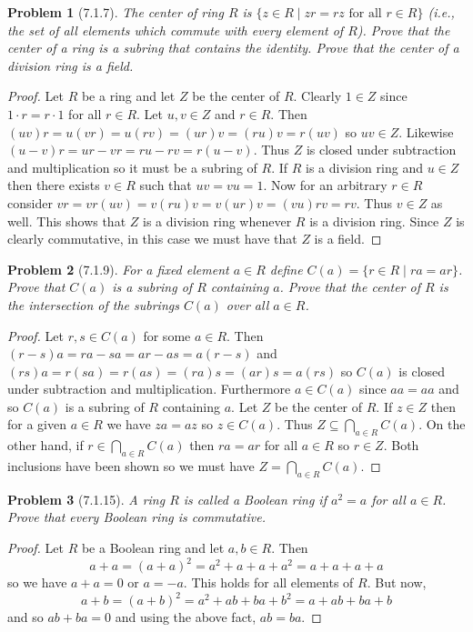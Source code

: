 \documentclass{article}
\newtheorem{problem}{Problem}
\begin{document}
\begin{problem}[7.1.7]
The center of ring $R$ is $\{z \in R \mid zr = rz \text{ for all } r \in R\}$ (i.e., the set of all elements which commute with every element of $R$). Prove that the center of a ring is a subring that contains the identity. Prove that the center of a division ring is a field.
\end{problem}
\begin{proof}
Let $R$ be a ring and let $Z$ be the center of $R$. Clearly $1 \in Z$ since $1 \cdot r = r \cdot 1$ for all $r \in R$. Let $u,v \in Z$ and $r \in R$. Then $(uv)r = u(vr) = u(rv) = (ur)v = (ru)v = r(uv)$ so $uv \in Z$. Likewise $(u-v)r = ur-vr = ru-rv=r(u-v)$. Thus $Z$ is closed under subtraction and multiplication so it must be a subring of $R$. If $R$ is a division ring and $u \in Z$ then there exists $v \in R$ such that $uv = vu = 1$. Now for an arbitrary $r \in R$ consider $vr = vr(uv) = v(ru)v = v(ur)v = (vu)rv = rv$. Thus $v \in Z$ as well. This shows that $Z$ is a division ring whenever $R$ is a division ring. Since $Z$ is clearly commutative, in this case we must have that $Z$ is a field.
\end{proof}

\begin{problem}[7.1.9]
For a fixed element $a \in R$ define $C(a) = \{r \in R \mid ra = ar\}$. Prove that $C(a)$ is a subring of $R$ containing $a$. Prove that the center of $R$ is the intersection of the subrings $C(a)$ over all $a \in R$.
\end{problem}
\begin{proof}
Let $r,s \in C(a)$ for some $a \in R$. Then $(r-s)a = ra-sa = ar-as = a(r-s)$ and $(rs)a = r(sa) = r(as) = (ra)s = (ar)s = a(rs)$ so $C(a)$ is closed under subtraction and multiplication. Furthermore $a \in C(a)$ since $aa = aa$ and so $C(a)$ is a subring of $R$ containing $a$. Let $Z$ be the center of $R$. If $z \in Z$ then for a given $a \in R$ we have $za = az$ so $z \in C(a)$. Thus $Z \subseteq \bigcap_{a \in R} C(a)$. On the other hand, if $r \in \bigcap_{a \in R} C(a)$ then $ra = ar$ for all $a \in R$ so $r \in Z$. Both inclusions have been shown so we must have $Z = \bigcap_{a \in R} C(a)$.
\end{proof}

\begin{problem}[7.1.15]
A ring $R$ is called a \emph{Boolean ring} if $a^2 = a$ for all $a \in R$. Prove that every Boolean ring is commutative.
\end{problem}
\begin{proof}
Let $R$ be a Boolean ring and let $a, b \in R$. Then
\[
a + a = (a + a)^2 = a^2 + a + a + a^2 = a + a + a + a
\]
so we have $a + a = 0$ or $a = -a$. This holds for all elements of $R$. But now,
\[
a + b = (a+b)^2 = a^2 + ab + ba + b^2 = a + ab + ba + b
\]
and so $ab + ba = 0$ and using the above fact, $ab = ba$.
\end{proof}
\end{document}
